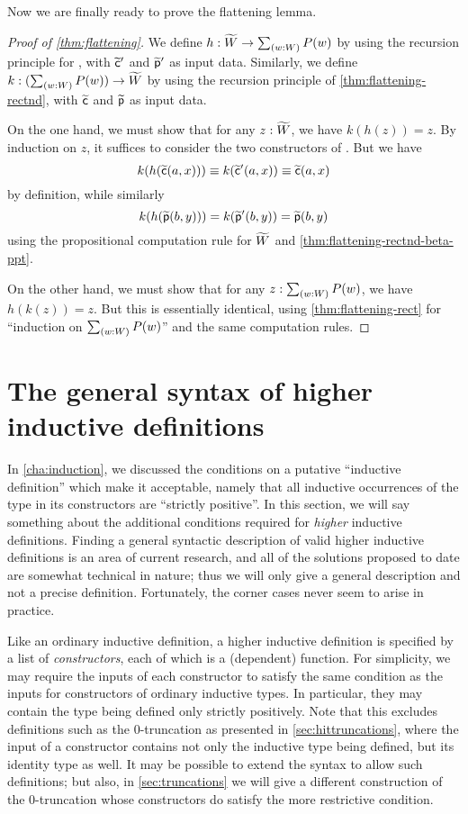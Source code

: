 Now we are finally ready to prove the flattening lemma.

\begin{proof}[Proof of \autoref{thm:flattening}]
  We define $h:\Wtil \to \sm{w:W}P(w)$ by using the recursion principle for \Wtil, with $\widetilde{\mathsf{c}}'$ and $\widetilde{\mathsf{p}}'$ as input data.
  Similarly, we define $k:(\sm{w:W}P(w)) \to \Wtil$ by using the recursion principle of \autoref{thm:flattening-rectnd}, with $\widetilde{\mathsf{c}}$ and $\widetilde{\mathsf{p}}$ as input data.

  On the one hand, we must show that for any $z:\widetilde{W}$, we have $k(h(z))=z$.
  By induction on $z$, it suffices to consider the two constructors of \Wtil.
  But we have
  \[k(h(\widetilde{\mathsf{c}}(a,x))) \equiv k(\widetilde{\mathsf{c}}'(a,x)) \equiv \widetilde{\mathsf{c}}(a,x)\]
  by definition, while similarly
  \[{k}\mathopen{}\left({{h}\mathopen{}\left({\widetilde{\mathsf{p}}(b,y)}\right)\mathclose{}}\right)\mathclose{} = {k}\mathopen{}\left({\widetilde{\mathsf{p}}'(b,y)}\right)\mathclose{} = \widetilde{\mathsf{p}}(b,y) \]
  using the propositional computation rule for $\widetilde{W}$ and \autoref{thm:flattening-rectnd-beta-ppt}.

  On the other hand, we must show that for any $z:\sm{w:W}P(w)$, we have $h(k(z))=z$.
  But this is essentially identical, using \autoref{thm:flattening-rect} for ``induction on $\sm{w:W}P(w)$'' and the same computation rules.
\end{proof}

\section{The general syntax of higher inductive definitions}
\label{sec:naturality}

In \autoref{cha:induction}, we discussed the conditions on a putative ``inductive definition'' which make it acceptable, namely that all inductive occurrences of the type in its constructors are ``strictly positive''.
In this section, we will say something about the additional conditions required for \emph{higher} inductive definitions.
Finding a general syntactic description of valid higher inductive definitions is an area of current research, and all of the solutions proposed to date are somewhat technical in nature; thus we will only give a general description and not a precise definition.
Fortunately, the corner cases never seem to arise in practice.

Like an ordinary inductive definition, a higher inductive definition is specified by a list of \emph{constructors}, each of which is a (dependent) function.
For simplicity, we may require the inputs of each constructor to satisfy the same condition as the inputs for constructors of ordinary inductive types.
In particular, they may contain the type being defined only strictly positively.
Note that this excludes definitions such as the $0$-truncation as presented in \autoref{sec:hittruncations}, where the input of a constructor contains not only the inductive type being defined, but its identity type as well.
It may be possible to extend the syntax to allow such definitions; but also, in \autoref{sec:truncations} we will give a different construction of the $0$-truncation whose constructors do satisfy the more restrictive condition.

